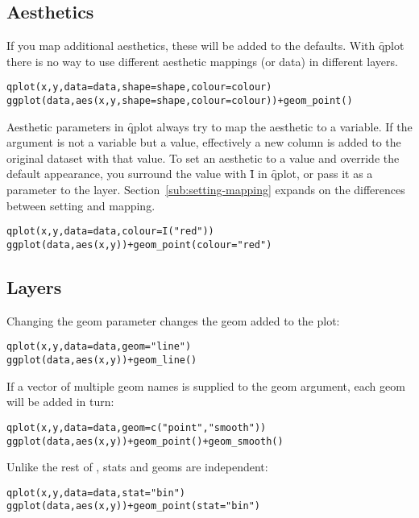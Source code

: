\subsection{Aesthetics}

If you map additional aesthetics, these will be added to the defaults.  With \f{qplot} there is no way to use different aesthetic mappings (or data) in different layers.

\begin{alltt}
qplot(x, y, data = data, shape = shape, colour = colour)
ggplot(data, aes(x, y, shape = shape, colour = colour)) + geom_point()
\end{alltt}

Aesthetic parameters in \f{qplot} always try to map the aesthetic to a variable.  If the argument is not a variable but a value, effectively a new column is added to the original dataset with that value.  To set an aesthetic to a value and override the default appearance, you surround the value with \f{I} in \f{qplot}, or pass it as a parameter to the layer.  Section~\ref{sub:setting-mapping} expands on the differences between setting and mapping.

\begin{alltt}
qplot(x, y, data = data, colour = I("red"))
ggplot(data, aes(x, y)) + geom_point(colour = "red")
\end{alltt}

\subsection{Layers}

Changing the geom parameter changes the geom added to the plot:

\begin{alltt}
qplot(x, y, data = data, geom = "line")
ggplot(data, aes(x, y)) + geom_line()
\end{alltt}

If a vector of multiple geom names is supplied to the geom argument, each geom will be added in turn:

\begin{alltt}
qplot(x, y, data = data, geom = c("point", "smooth"))
ggplot(data, aes(x, y)) + geom_point() + geom_smooth()
\end{alltt}

Unlike the rest of \ggplot, stats and geoms are independent:

\begin{alltt}
qplot(x, y, data = data, stat = "bin")
ggplot(data, aes(x, y)) + geom_point(stat = "bin")  
\end{alltt}

